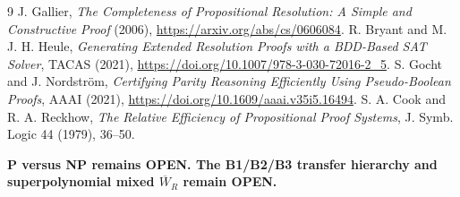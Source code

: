 \documentclass[11pt]{article}
\begin{document}
\begin{thebibliography}{9}
 J. Gallier, \emph{The Completeness of Propositional Resolution: A Simple and Constructive Proof} (2006), \url{https://arxiv.org/abs/cs/0606084}.
 R. Bryant and M. J. H. Heule, \emph{Generating Extended Resolution Proofs with a BDD-Based SAT Solver}, TACAS (2021), \url{https://doi.org/10.1007/978-3-030-72016-2_5}.
 S. Gocht and J. Nordstr\"om, \emph{Certifying Parity Reasoning Efficiently Using Pseudo-Boolean Proofs}, AAAI (2021), \url{https://doi.org/10.1609/aaai.v35i5.16494}.
 S. A. Cook and R. A. Reckhow, \emph{The Relative Efficiency of Propositional Proof Systems}, J. Symb. Logic 44 (1979), 36--50.
\end{thebibliography}
\noindent\textbf{P versus NP remains OPEN. The B1/B2/B3 transfer hierarchy and superpolynomial mixed $\overline W_R$ remain OPEN.}
\end{document}
